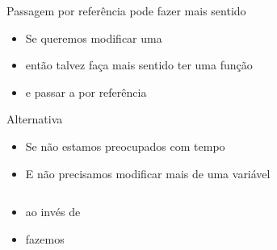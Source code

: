 \documentclass{beamer}
\begin{document}
\begin{frame}[<+->]{Passagem por referência pode fazer mais sentido}
  \begin{itemize}
    \item Se queremos modificar uma 
    \item então talvez faça mais sentido ter uma função 
    \item e passar a  por referência
  \end{itemize}

  \bigskip

  \action{}
  \action{}
\end{frame}

\begin{frame}[<+->]{Alternativa}
  \begin{itemize}
    \item Se não estamos preocupados com tempo
    \item E não precisamos modificar mais de uma variável
  \end{itemize}

  \begin{columns}
    \begin{column}[t]{0.5\linewidth}
      
    \end{column}
    \begin{column}[t]{0.5\linewidth}
      
    \end{column}
  \end{columns}

  \bigskip
  \begin{itemize}
    \item ao invés de 
    \item fazemos 
  \end{itemize}

  \medskip
\end{frame}
\end{document}
